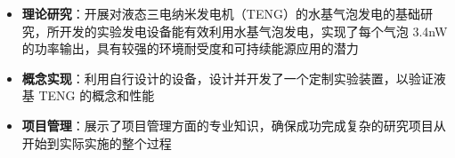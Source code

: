 
\begin{itemize}
\small 
  \item \textbf{理论研究}：开展对液态三电纳米发电机（TENG）的水基气泡发电的基础研究，所开发的实验发电设备能有效利用水基气泡发电，实现了每个气泡 3.4nW 的功率输出，具有较强的环境耐受度和可持续能源应用的潜力
  \item \textbf{概念实现}：利用自行设计的设备，设计并开发了一个定制实验装置，以验证液基 TENG 的概念和性能
  \item \textbf{项目管理}：展示了项目管理方面的专业知识，确保成功完成复杂的研究项目从开始到实际实施的整个过程
\end{itemize}

